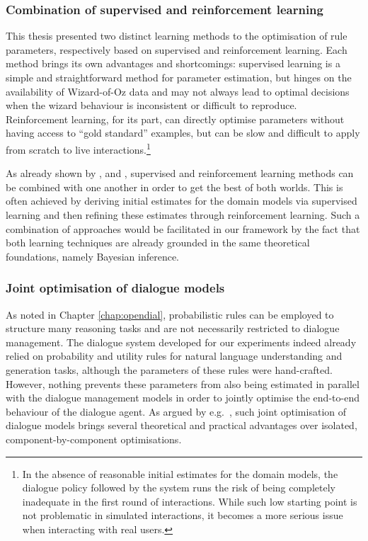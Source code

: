 \subsubsection*{Combination of supervised and reinforcement learning}

This thesis presented two distinct learning methods to the optimisation of rule parameters, respectively based on supervised and reinforcement learning.  Each method brings its own advantages and shortcomings: supervised learning is a simple and straightforward method for parameter estimation, but hinges on the availability of Wizard-of-Oz data and may not always lead to optimal decisions when the wizard behaviour is inconsistent or difficult to reproduce.  Reinforcement learning, for its part, can directly optimise parameters without having access to ``gold standard'' examples, but can be slow and difficult to apply from scratch to live interactions.\footnote{In the absence of reasonable initial estimates for the domain models, the dialogue policy followed by the system runs the risk of being completely inadequate in the first round of interactions.  While such low starting point is not problematic in simulated interactions, it becomes a more serious issue when interacting with real users.} 

As already shown by \cite{williams2003}, \cite{rieser2006} and \cite{Henderson:2008}, supervised and reinforcement learning methods can be combined with one another in order to get the best of both worlds. This is often achieved by deriving initial estimates for the domain models via supervised learning and then refining these estimates through reinforcement learning. Such a combination of approaches would be facilitated in our framework by the fact that both learning techniques are already grounded in the same theoretical foundations, namely Bayesian inference. 

\subsubsection*{Joint optimisation of dialogue models}

As noted in Chapter \ref{chap:opendial}, probabilistic rules can be employed to structure many reasoning tasks and are not necessarily restricted to dialogue management. The dialogue system developed for our experiments indeed already relied on probability and utility rules for natural language understanding and generation tasks, although the parameters of these rules were hand-crafted. However, nothing prevents these parameters from also being estimated in parallel with the dialogue management models in order to jointly optimise the end-to-end behaviour of the dialogue agent.  As argued by e.g.\ \cite{Lemon:2011}, such joint optimisation of dialogue models brings several theoretical and practical advantages over isolated, component-by-component optimisations.

